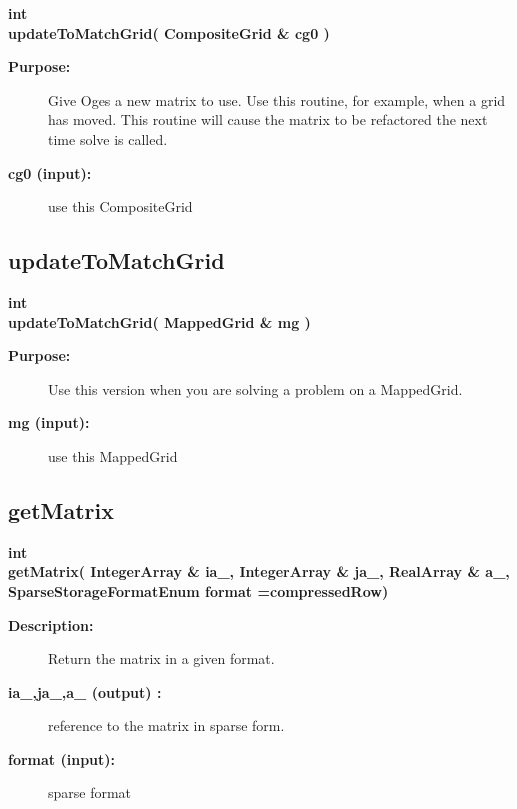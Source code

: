 \begin{flushleft} \textbf{%
int  \\ 
\settowidth{\OgesIncludeArgIndent}{updateToMatchGrid(}%
updateToMatchGrid( CompositeGrid \& cg0 )
}\end{flushleft}
\begin{description}
\item[{\bf Purpose:}]  
    Give Oges a new matrix to use. Use this routine, for example, when a grid has
    moved. 
    This routine will cause the matrix to be refactored the next time solve is called.

\item[{\bf cg0 (input):}]  use this CompositeGrid
\end{description}
\subsection{updateToMatchGrid}
 
\begin{flushleft} \textbf{%
int  \\ 
\settowidth{\OgesIncludeArgIndent}{updateToMatchGrid(}%
updateToMatchGrid( MappedGrid \& mg )
}\end{flushleft}
\begin{description}
\item[{\bf Purpose:}] 
    Use this version when you are solving a problem on a MappedGrid.
\item[{\bf mg (input):}]  use this MappedGrid
\end{description}
\subsection{getMatrix}
 
\begin{flushleft} \textbf{%
int  \\ 
\settowidth{\OgesIncludeArgIndent}{getMatrix(}%
getMatrix( IntegerArray \& ia\_, IntegerArray \& ja\_, RealArray \& a\_, \\ 
\hspace{\OgesIncludeArgIndent}SparseStorageFormatEnum format  =compressedRow)
}\end{flushleft}
\begin{description}
\item[{\bf Description:}] 
   Return the matrix in a given format.
\item[{\bf ia\_,ja\_,a\_ (output) :}]  reference to the matrix in sparse form.
\item[{\bf format (input):}]  sparse format
\end{description}
